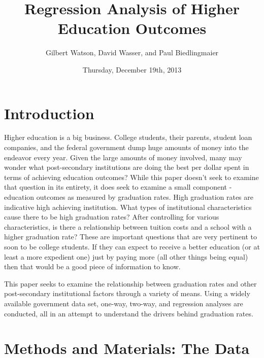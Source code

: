\documentclass{article}
\begin{document}


\title{Regression Analysis of Higher Education Outcomes}
\author{Gilbert Watson, David Wasser, and Paul Biedlingmaier}
\date{Thursday, December 19th, 2013}





\maketitle
\tableofcontents

\section{Introduction}

Higher education is a big business. College students, their parents, student loan companies, and the federal government dump huge amounts of money into the endeavor every year. Given the large amounts of money involved, many may wonder what post-secondary institutions are doing the best per dollar spent in terms of achieving education outcomes? While this paper doesn't seek to examine that question in its entirety, it does seek to examine a small component - education outcomes as measured by graduation rates. High graduation rates are indicative high achieving institution. What types of institutional characteristics cause there to be high graduation rates? After controlling for various characteristics, is there a relationship between tuition costs and a school with a higher graduation rate? These are important questions that are very pertinent to soon to be college students. If they can expect to receive a better education (or at least a more expedient one) just by paying more (all other things being equal) then that would be a good piece of information to know.

This paper seeks to examine the relationship between graduation rates and other post-secondary institutional factors through a variety of means. Using a widely available government data set, one-way, two-way, and regression analyses are conducted, all in an attempt to understand the drivers behind graduation rates.

\section{Methods and Materials: The Data}
\end{document}
